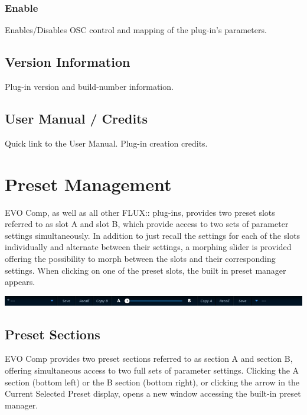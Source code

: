 \documentclass[
  letterpaper,
  DIV=11,
  numbers=noendperiod]{scrreport}
\begin{document}
\hypertarget{enable}{%
\subsection{Enable}\label{enable}}

Enables/Disables OSC control and mapping of the plug-in's parameters.

\hypertarget{version-information}{%
\section{Version Information}\label{version-information}}

Plug-in version and build-number information.

\hypertarget{user-manual-credits}{%
\section{User Manual / Credits}\label{user-manual-credits}}

Quick link to the User Manual. Plug-in creation credits.


\hypertarget{preset-management}{%
\chapter{Preset Management}\label{preset-management}}

EVO Comp, as well as all other FLUX:: plug-ins, provides two preset
slots referred to as slot A and slot B, which provide access to two sets
of parameter settings simultaneously. In addition to just recall the
settings for each of the slots individually and alternate between their
settings, a morphing slider is provided offering the possibility to
morph between the slots and their corresponding settings. When clicking
on one of the preset slots, the built in preset manager appears.

\includegraphics{include/ManualEvoChannel-013.png}

\hypertarget{preset-sections}{%
\section{Preset Sections}\label{preset-sections}}

EVO Comp provides two preset sections referred to as section A and
section B, offering simultaneous access to two full sets of parameter
settings. Clicking the A section (bottom left) or the B section (bottom
right), or clicking the arrow in the Current Selected Preset display,
opens a new window accessing the built-in preset manager.
\end{document}
